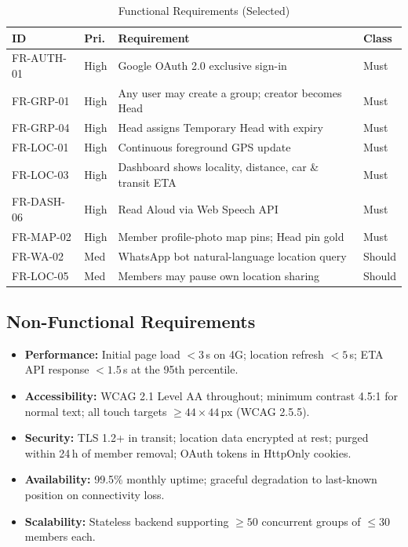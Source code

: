 \documentclass[conference]{IEEEtran}
\begin{document}
\begin{table}[htbp]
\caption{Functional Requirements (Selected)}
\label{tab:fr}
\renewcommand{\arraystretch}{1.2}
\begin{tabularx}{\columnwidth}{@{}llXl@{}}
\toprule
\textbf{ID} & \textbf{Pri.} & \textbf{Requirement} & \textbf{Class} \\
\midrule
FR-AUTH-01 & High & Google OAuth 2.0 exclusive sign-in & Must \\
FR-GRP-01  & High & Any user may create a group; creator becomes Head & Must \\
FR-GRP-04  & High & Head assigns Temporary Head with expiry & Must \\
FR-LOC-01  & High & Continuous foreground GPS update & Must \\
FR-LOC-03  & High & Dashboard shows locality, distance, car \& transit ETA & Must \\
FR-DASH-06 & High & Read Aloud via Web Speech API & Must \\
FR-MAP-02  & High & Member profile-photo map pins; Head pin gold & Must \\
FR-WA-02   & Med  & WhatsApp bot natural-language location query & Should \\
FR-LOC-05  & Med  & Members may pause own location sharing & Should \\
\bottomrule
\end{tabularx}
\end{table}

\subsection{Non-Functional Requirements}

\begin{itemize}
  \item \textbf{Performance:} Initial page load $<3$\,s on 4G;
        location refresh $<5$\,s; ETA API response $<1.5$\,s at
        the 95th percentile.
  \item \textbf{Accessibility:} WCAG 2.1 Level AA throughout;
        minimum contrast 4.5:1 for normal text; all touch targets
        $\geq44\times44$\,px (WCAG 2.5.5).
  \item \textbf{Security:} TLS 1.2+ in transit; location data
        encrypted at rest; purged within 24\,h of member removal;
        OAuth tokens in HttpOnly cookies.
  \item \textbf{Availability:} 99.5\% monthly uptime; graceful
        degradation to last-known position on connectivity loss.
  \item \textbf{Scalability:} Stateless backend supporting
        $\geq50$ concurrent groups of $\leq30$ members each.
\end{itemize}
\end{document}
